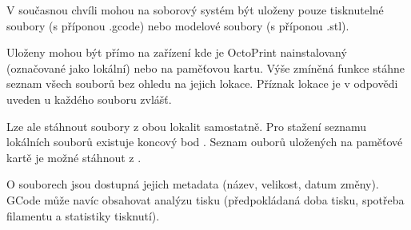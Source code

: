 V současnou chvíli mohou na soborový systém být uloženy pouze tisknutelné soubory (s příponou .gcode) nebo modelové soubory (s příponou .stl).

Uloženy mohou být přímo na zařízení kde je OctoPrint nainstalovaný (označované jako lokální) nebo na paměťovou kartu.
Výše zmíněná funkce stáhne seznam všech souborů bez ohledu na jejich lokace.
Příznak lokace je v odpovědi uveden u každého souboru zvlášť.

Lze ale stáhnout soubory z obou lokalit samostatně.
Pro stažení seznamu lokálních souborů existuje koncový bod .
Seznam ouborů uložených na paměťové kartě je možné stáhnout z .

O souborech jsou dostupná jejich metadata (název, velikost, datum změny).
GCode může navíc obsahovat analýzu tisku (předpokládaná doba tisku, spotřeba filamentu a statistiky tisknutí).
